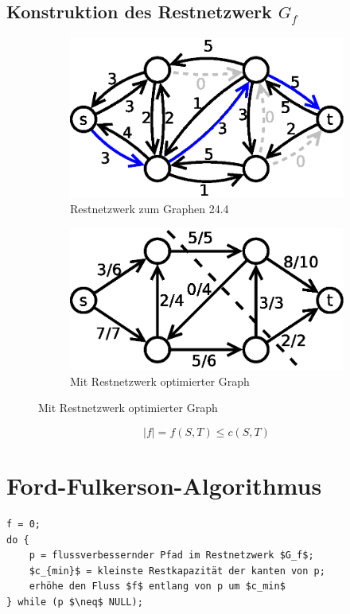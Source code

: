 \subsection{Konstruktion des Restnetzwerk $G_f$}
\begin{figure}[H]
\centering
\begin{subfigure}[H]{0.3\linewidth}
\includegraphics[width=\linewidth]{24/Grafik/Diagramm6}
\caption{Restnetzwerk zum Graphen 24.4}
\end{subfigure}
\begin{subfigure}[H]{0.3\linewidth}
\includegraphics[width=\linewidth]{24/Grafik/Diagramm7}
\caption{Mit Restnetzwerk optimierter Graph}
\end{subfigure}	
\label{fig:Diagramm6}
\end{figure}
\[ |f| = f(S,T) \leq c(S,T) \]
\section{Ford-Fulkerson-Algorithmus}
\begin{lstlisting}
f = 0;
do {
	p = flussverbessernder Pfad im Restnetzwerk $G_f$;
	$c_{min}$ = kleinste Restkapazität der kanten von p;
	erhöhe den Fluss $f$ entlang von p um $c_min$
} while (p $\neq$ NULL);
\end{lstlisting}